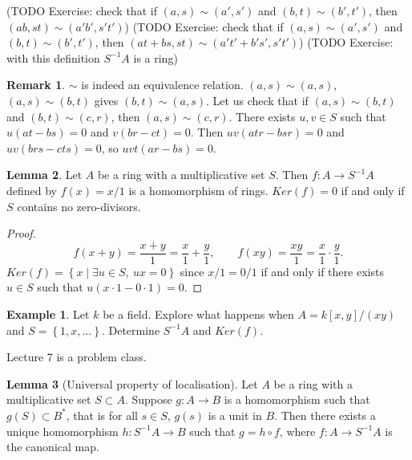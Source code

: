 \documentclass{article}
\newcommand{\rb}[1]{\left( #1 \right)}
\renewcommand{\sb}[1]{\left[ #1 \right]}
\newcommand{\cb}[1]{\left\{ #1 \right\}}
\theoremstyle{definition}\newtheorem{definition}{Definition}[section]
\theoremstyle{definition}\newtheorem{remark}[definition]{Remark}
\theoremstyle{definition}\newtheorem*{example}{Example}
\theoremstyle{definition}\newtheorem*{note}{Note}
\newtheorem{lemma}[definition]{Lemma}
\begin{document}
(TODO Exercise: check that if $ \rb{a, s} \sim \rb{a', s'} $ and $ \rb{b, t} \sim \rb{b', t'} $, then $ \rb{ab, st} \sim \rb{a'b', s't'} $)
(TODO Exercise: check that if $ \rb{a, s} \sim \rb{a', s'} $ and $ \rb{b, t} \sim \rb{b', t'} $, then $ \rb{at + bs, st} \sim \rb{a't' + b's', s't'} $)
(TODO Exercise: with this definition $ S^{-1}A $ is a ring)

\begin{remark}
$ \sim $ is indeed an equivalence relation. $ \rb{a, s} \sim \rb{a, s} $, $ \rb{a, s} \sim \rb{b, t} $ gives $ \rb{b, t} \sim \rb{a, s} $. Let us check that if $ \rb{a, s} \sim \rb{b, t} $ and $ \rb{b, t} \sim \rb{c, r} $, then $ \rb{a, s} \sim \rb{c, r} $. There exists $ u, v \in S $ such that $ u\rb{at - bs} = 0 $ and $ v\rb{br - ct} = 0 $. Then $ uv\rb{atr - bsr} = 0 $ and $ uv\rb{brs - cts} = 0 $, so $ uvt\rb{ar - bs} = 0 $.
\end{remark}

\begin{lemma}
Let $ A $ be a ring with a multiplicative set $ S $. Then $ f : A \to S^{-1}A $ defined by $ f\rb{x} = x / 1 $ is a homomorphism of rings. $ Ker\rb{f} = 0 $ if and only if $ S $ contains no zero-divisors.
\end{lemma}

\begin{proof}
$$ f\rb{x + y} = \dfrac{x + y}{1} = \dfrac{x}{1} + \dfrac{y}{1}, \qquad f\rb{xy} = \dfrac{xy}{1} = \dfrac{x}{1} \cdot \dfrac{y}{1}. $$
$ Ker\rb{f} = \cb{x \mid \exists u \in S, \ ux = 0} $ since $ x / 1 = 0 / 1 $ if and only if there exists $ u \in S $ such that $ u\rb{x \cdot 1 - 0 \cdot 1} = 0 $.
\end{proof}

\begin{example}
Let $ k $ be a field. Explore what happens when $ A = k\sb{x, y} / \rb{xy} $ and $ S = \cb{1, x, \dots} $. Determine $ S^{-1}A $ and $ Ker\rb{f} $.
\end{example}


Lecture 7 is a problem class.


\begin{lemma}[Universal property of localisation]
Let $ A $ be a ring with a multiplicative set $ S \subset A $. Suppose $ g : A \to B $ is a homomorphism such that $ g\rb{S} \subset B^* $, that is for all $ s \in S $, $ g\rb{s} $ is a unit in $ B $. Then there exists a unique homomorphism $ h : S^{-1}A \to B $ such that $ g = h \circ f $, where $ f : A \to S^{-1}A $ is the canonical map.
\end{lemma}
\end{document}
